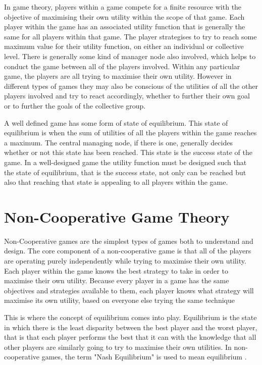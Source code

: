 \documentclass[a4paper, notitlepage]{report}
\begin{document}
In game theory, players within a game compete for a finite resource with the
objective of maximising their own utility within the scope of that game. Each
player within the game has an associated utility function that is generally the
same for all players within that game. The player strategises to try to reach
some maximum value for their utility function, on either an
individual or collective level. There is generally some kind of manager node
also involved, which helps to conduct the game between all of the players
involved. Within any particular game, the players are all trying to maximise
their own utility. However in different types of games they may also be
conscious of the utilities of all the other players involved and try to react
accordingly, whether to further their own goal or to further the goals of the
collective group.

A well defined game has some form of state of equilibrium. This state of
equilibrium is when the sum of utilities of all the players within the game
reaches a maximum. The central managing node, if there is one, generally decides
whether or not this state has been reached. This state is the success state of
the game. In a well-designed game the utility function must be designed such
that the state of equilibrium, that is the success state, not only can be
reached but also that reaching that state is appealing to all players within the
game.
\section{Non-Cooperative Game Theory}
\label{sec:org7a48682}
Non-Cooperative games are the simplest types of games both to understand and
design. The core component of a non-cooperative game is that all of the players
are operating purely independently while trying to maximise their own utility.
Each player within the game knows the best strategy to take in order to maximise
their own utility. Because every player in a game has the same objectives and
strategies available to them, each player knows what strategy will maximise its
own utility, based on everyone else trying the same technique

This is where the concept of equilibrium comes into play. Equilibrium is the
state in which there is the least disparity between the best player and the
worst player, that is that each player performs the best that it can with the
knowledge that all other players are similarly going to try to maximise their
own utilities. In non-cooperative games, the term "Nash Equilibrium" is used to
mean equilibrium \cite{cournot1960researches}.
\end{document}
